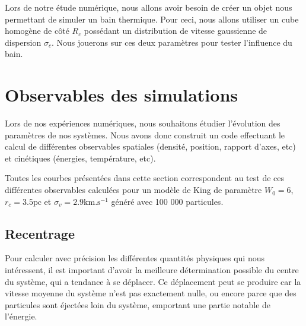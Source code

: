 			Lors de notre étude numérique, nous allons avoir besoin de créer un objet nous permettant de
			simuler un bain thermique. Pour ceci, nous allons utiliser un cube homogène de côté $R_c$
			possédant un distribution de vitesse gaussienne de dispersion $\sigma_c$.
			Nous jouerons sur ces deux paramètres pour tester l'influence du bain.

	\section{Observables des simulations}  %


		Lors de nos expériences numériques, nous souhaitons étudier l'évolution des paramètres de nos systèmes. %
		Nous avons donc construit un code effectuant le calcul de différentes observables spatiales (densité, position, rapport d'axes, etc)
		et cinétiques (énergies, température, etc).

		Toutes les courbes présentées dans cette section correspondent au test de ces différentes observables calculées pour un modèle de King
		de paramètre $W_0=6$, $r_c = 3.5\mathrm{pc}$ et $\sigma_v = 2.9 \mathrm{km}.\mathrm{s}^{-1}$ généré avec 100 000 particules.



		\subsection{Recentrage}

			Pour calculer avec précision les différentes quantités physiques qui nous intéressent, il est
			important d'avoir la meilleure détermination possible du centre du système, qui a tendance à se
			déplacer. Ce déplacement peut se produire car la vitesse moyenne du système n'est pas exactement
			nulle, ou encore parce que des particules sont éjectées loin du système, emportant une partie
			notable de l'énergie.


